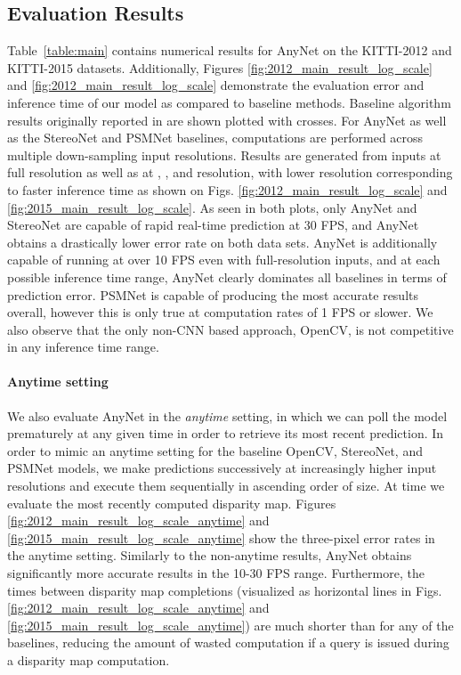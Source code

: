 \documentclass[letterpaper, 10 pt, conference]{ieeeconf}
\newcommand{\nameshort}[1]{AnyNet}
\begin{document}
\subsection{Evaluation Results}
Table~\ref{table:main} contains numerical results for \nameshort{} on the KITTI-2012 and KITTI-2015 datasets. Additionally, Figures \ref{fig:2012_main_result_log_scale} and \ref{fig:2012_main_result_log_scale} demonstrate the evaluation error and inference time of our model as compared to baseline methods. Baseline algorithm results originally reported in \cite{bradski2000opencv,khamis2018stereonet,zhao2017pyramid,dispnet,smolyanskiy2018importance} are shown plotted with crosses. For \nameshort{} as well as the StereoNet and PSMNet baselines, computations are performed across multiple down-sampling input resolutions. Results are generated from inputs at full resolution as well as at , , and  resolution, with lower resolution corresponding to faster inference time as shown on Figs. \ref{fig:2012_main_result_log_scale} and \ref{fig:2015_main_result_log_scale}.
As seen in both plots, only \nameshort{} and StereoNet are capable of rapid real-time prediction at 30 FPS, and \nameshort{} obtains a drastically lower error rate on both data sets. \nameshort{} is additionally capable of running at over 10 FPS even with full-resolution inputs, and at each possible inference time range, \nameshort{} clearly dominates all baselines in terms of prediction error. PSMNet is capable of producing the most accurate results overall, however this is only true at computation rates of 1 FPS or slower. We also observe that the only non-CNN based approach, OpenCV, is not competitive in any inference time range.



\paragraph{\textbf{Anytime setting}}
We also evaluate \nameshort{} in the \emph{anytime} setting, in which we can poll the model prematurely at any given time  in order to retrieve its most recent prediction. In order to mimic an anytime setting for the baseline OpenCV, StereoNet, and PSMNet models, we make predictions successively at increasingly higher input resolutions and execute them sequentially in ascending order of size. At time  we evaluate the most recently computed disparity map. Figures \ref{fig:2012_main_result_log_scale_anytime} and \ref{fig:2015_main_result_log_scale_anytime} show the three-pixel error rates in the anytime setting. Similarly to the non-anytime results, \nameshort{} obtains significantly more accurate results in the 10-30 FPS range. Furthermore, the times between disparity map completions (visualized as horizontal lines in Figs. \ref{fig:2012_main_result_log_scale_anytime} and \ref{fig:2015_main_result_log_scale_anytime}) are much shorter than for any of the baselines, reducing the amount of wasted computation if a query is issued during a disparity map computation.
\end{document}
